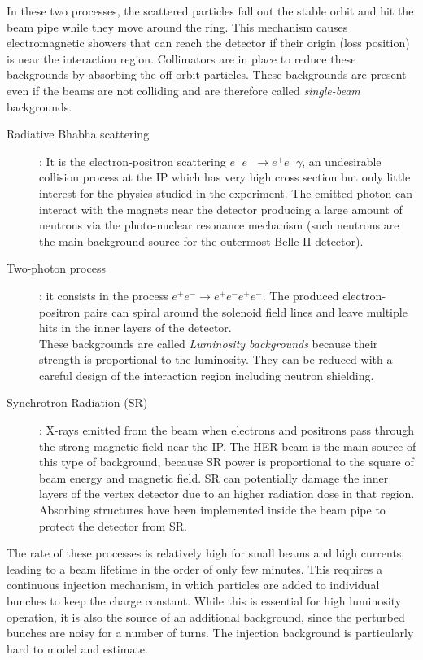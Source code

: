 In these two processes, the scattered particles fall out the stable orbit and hit the beam pipe while they move around the ring. This mechanism causes electromagnetic showers that can reach the detector if their origin (loss position) is near the interaction region. Collimators are in place to reduce these backgrounds by absorbing the off-orbit particles. These backgrounds are present even if the beams are not colliding and are therefore called \textit{single-beam} backgrounds.


\begin{description}
\item[Radiative Bhabha scattering]:
	It is the electron-positron scattering $e^{+}e^{-} \rightarrow e^{+}e^{-} \gamma$, an undesirable collision process at the IP which has very high cross section but only little interest for the physics studied in the experiment.
	The emitted photon can interact with the magnets near the detector producing a large amount of neutrons via the photo-nuclear resonance mechanism (such neutrons are the main background source for the outermost Belle II detector).\\
	
\item[Two-photon process]:
	it consists in the process $e^{+}e^{-} \rightarrow e^{+}e^{-}e^{+}e^{-} $. The produced electron-positron pairs can spiral around the solenoid field lines and leave multiple hits in the inner layers of the detector.\\
	
These backgrounds are called \textit{Luminosity backgrounds} because their strength is proportional to the luminosity. They can be reduced with a careful design of the interaction region including neutron shielding.

\item[Synchrotron Radiation (SR)]:
	X-rays emitted from the beam when electrons and positrons pass through the strong magnetic field near the IP. The HER beam is the main source of this type of background, because SR power is proportional to the square of beam energy and magnetic field.
SR can potentially damage the inner layers of the vertex detector due to an higher radiation dose in that region. Absorbing structures have been implemented inside the beam pipe to protect the detector from SR.
\end{description}

The rate of these processes is relatively high for small beams and high currents, leading to a beam lifetime in the order of only few minutes. This requires a continuous injection mechanism, in which particles are added to individual bunches to keep the charge constant. While this is essential for high luminosity operation, it is also the source of an additional background, since the perturbed bunches are noisy for a number of turns. The injection background is particularly hard to model and estimate.

